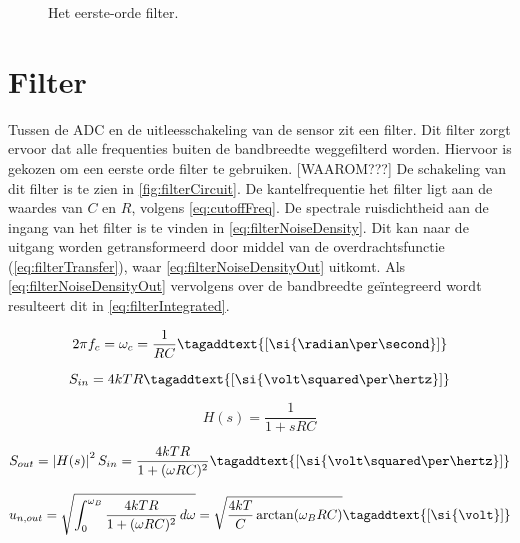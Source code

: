 \begin{figure}[ht]
    \centering
    \def\svgwidth{0.3\textwidth}
    
    \caption{Het eerste-orde filter.}
    \label{fig:filterCircuit}
\end{figure}

\section{Filter}
Tussen de ADC en de uitleesschakeling van de sensor zit een filter. Dit filter zorgt ervoor dat alle frequenties buiten de bandbreedte weggefilterd worden. Hiervoor is gekozen om een eerste orde filter te gebruiken. [WAAROM???]
De schakeling van dit filter is te zien in \autoref{fig:filterCircuit}. De kantelfrequentie het filter ligt aan de waardes van $C$ en $R$, volgens \autoref{eq:cutoffFreq}.
De spectrale ruisdichtheid aan de ingang van het filter is te vinden in \autoref{eq:filterNoiseDensity}.
Dit kan naar de uitgang worden getransformeerd door middel van de overdrachtsfunctie (\autoref{eq:filterTransfer}), waar \autoref{eq:filterNoiseDensityOut} uitkomt.
Als \autoref{eq:filterNoiseDensityOut} vervolgens over de bandbreedte geïntegreerd wordt resulteert dit in \autoref{eq:filterIntegrated}.


\begin{equation} \label{eq:cutoffFreq}
    2\pi f_c = \omega_c = \frac{1}{RC}
    \tagaddtext{[\si{\radian\per\second}]}
\end{equation}

\begin{equation} \label{eq:filterNoiseDensity}
    S_{in} = 4kTR
    \tagaddtext{[\si{\volt\squared\per\hertz}]}
\end{equation}

\begin{equation} \label{eq:filterTransfer}
    H(s) = \frac{1}{1+sRC}
\end{equation}

\begin{equation} \label{eq:filterNoiseDensityOut}
    S_{out} = \left|H(s)\right|^2S_{in} = \frac{4kTR}{1+(\omega R C)^2}
    \tagaddtext{[\si{\volt\squared\per\hertz}]}
\end{equation}

\begin{equation} \label{eq:filterIntegrated}
    u_{n,out} = \sqrt{\int_{0}^{\omega_B} \frac{4kTR}{1+(\omega R C)^2} \, d\omega} = \sqrt{\frac{4kT}{C} \arctan(\omega_BRC)}
    \tagaddtext{[\si{\volt}]}
\end{equation}

